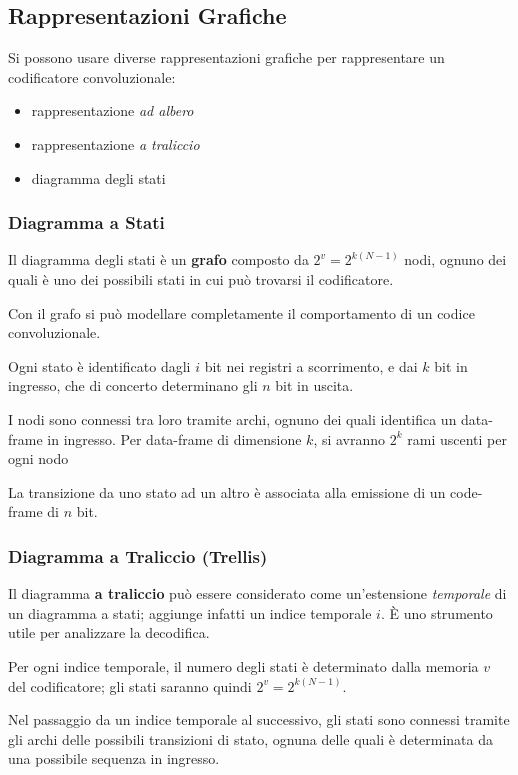 \subsection{Rappresentazioni Grafiche}
Si possono usare diverse rappresentazioni grafiche per rappresentare un codificatore convoluzionale:
\begin{itemize}
    \item rappresentazione \textit{ad albero}
    \item rappresentazione \textit{a traliccio}
    \item diagramma degli stati 
\end{itemize}
\subsubsection{Diagramma a Stati}
Il diagramma degli stati è un \textbf{grafo} composto da $2^v = 2^{k(N-1)}$ nodi, ognuno dei quali è uno dei possibili stati in cui può trovarsi il codificatore.

\noindent Con il grafo si può modellare completamente il comportamento di un codice convoluzionale.

\noindent Ogni stato è identificato dagli $i$ bit nei registri a scorrimento, e dai $k$ bit in ingresso, che di concerto determinano gli $n$ bit in uscita.

\noindent I nodi sono connessi tra loro tramite archi, ognuno dei quali identifica un data-frame in ingresso. Per data-frame di dimensione $k$, si avranno $2^k$ rami uscenti per ogni nodo

\noindent La transizione da uno stato ad un altro è associata alla emissione di un code-frame di $n$ bit.

\subsubsection{Diagramma a Traliccio (Trellis)}

Il diagramma \textbf{a traliccio} può essere considerato come un'estensione \textit{temporale} di un diagramma a stati; aggiunge infatti un indice temporale $i$. È uno strumento utile per analizzare la decodifica.

\noindent Per ogni indice temporale, il numero degli stati è determinato dalla memoria $v$ del codificatore; gli stati saranno quindi $2^v = 2^{k(N-1)}$.

\noindent Nel passaggio da un indice temporale al successivo, gli stati sono connessi tramite gli archi delle possibili transizioni di stato, ognuna delle quali è determinata da una possibile sequenza in ingresso.

